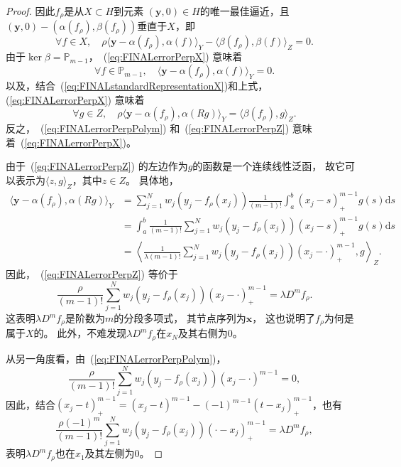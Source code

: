 \begin{proof}
因此$f_{\rho}$是从$X\subset H$到元素
$(\mathbf{y},0)\in H$的唯一最佳逼近，且
$(\mathbf{y},0)-(\alpha(f_{\rho}),\beta(f_{\rho}))$垂直于$X$，即
\begin{equation}
  \label{eq:FINALerrorPerpX}
  \forall f\in X,\quad
  \rho \langle \mathbf{y}-\alpha(f_{\rho}),\alpha(f) \rangle_{Y}
  -\langle \beta(f_{\rho}),\beta(f) \rangle_{Z}=0.
\end{equation}
由于$\ker\beta=\mathbb{P}_{m-1}$，~(\ref{eq:FINALerrorPerpX}) 意味着
\begin{equation}
  \label{eq:FINALerrorPerpPolym}
  \forall f\in \mathbb{P}_{m-1},\quad
  \langle \mathbf{y}-\alpha(f_{\rho}),\alpha(f) \rangle_{Y}=0.
\end{equation}
以及，结合~(\ref{eq:FINALstandardRepresentationX})和上式，
(\ref{eq:FINALerrorPerpX}) 意味着
\begin{equation}
  \label{eq:FINALerrorPerpZ}
  \forall g\in Z,\quad
  \rho\langle \mathbf{y}-\alpha(f_{\rho}),\alpha(Rg) \rangle_{Y}
  =\langle \beta(f_{\rho}),g \rangle_{Z}.
\end{equation}
反之，~(\ref{eq:FINALerrorPerpPolym}) 和~(\ref{eq:FINALerrorPerpZ})
 意味着~(\ref{eq:FINALerrorPerpX})。

由于~(\ref{eq:FINALerrorPerpZ}) 的左边作为$g$的函数是一个连续线性泛函，
故它可以表示为$\langle z,g \rangle_{Z}$，其中$z\in Z$。
具体地，
\begin{align*}
    \langle \mathbf{y}-\alpha(f_{\rho}),\alpha(Rg) \rangle_{Y}
  &=  \sum_{j=1}^{N}w_{j}(y_{j}-f_{\rho}(x_{j}))
    \frac{1}{(m-1)!}\int_{a}^{b}(x_{j}-s)_{+}^{m-1}g(s)\mathrm{d}s\\
  &=  \int_{a}^{b}\frac{1}{(m-1)!}
      \sum_{j=1}^{N}w_{j}(y_{j}-f_{\rho}(x_{j}))(x_{j}-s)_{+}^{m-1}
    g(s)\mathrm{d}s\\
  &=  \left\langle \frac{1}{\lambda (m-1)!}
    \sum_{j=1}^{N}w_{j}(y_{j}-f_{\rho}(x_{j}))(x_{j}-\cdot)_{+}^{m-1},g\right\rangle_{Z}.
\end{align*}
因此，~(\ref{eq:FINALerrorPerpZ}) 等价于
\begin{equation}
  \label{eq:FINALmthderfrho}
  \frac{\rho}{(m-1)!}\sum_{j=1}^{N}
  w_{j}(y_{j}-f_{\rho}(x_{j}))(x_{j}-\cdot)_{+}^{m-1}
  =\lambda D^{m}f_{\rho}.
\end{equation}
这表明$\lambda D^{m}f_{\rho}$是阶数为$m$的分段多项式，
其节点序列为$\mathbf{x}$，
这也说明了$f_{\rho}$为何是属于$X$的。
此外，不难发现$\lambda D^{m}f_{\rho}$在$x_{N}$及其右侧为0。

从另一角度看，由~(\ref{eq:FINALerrorPerpPolym})，
\begin{displaymath}
  \frac{\rho}{(m-1)!}\sum_{j=1}^{N}
  w_{j}(y_{j}-f_{\rho}(x_{j}))(x_{j}-\cdot)^{m-1}=0,
\end{displaymath}
因此，结合$(x_{j}-t)_{+}^{m-1}
=(x_{j}-t)^{m-1}-(-1)^{m-1}(t-x_{j})_{+}^{m-1}$，也有
\begin{equation}
  \label{eq:FINALmthderfrhoEquiv}
  \frac{\rho (-1)^{m}}{(m-1)!}\sum_{j=1}^{N}
  w_{j}(y_{j}-f_{\rho}(x_{j}))(\cdot-x_{j})_{+}^{m-1}
  =\lambda D^{m}f_{\rho},
\end{equation}
表明$\lambda D^{m}f_{\rho}$也在$x_{1}$及其左侧为0。


\end{proof}
